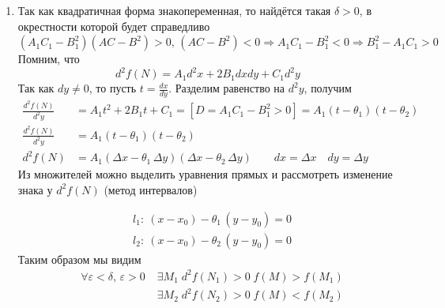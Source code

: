 \begin{Proof}
\begin{enumerate}
            \item Так как квадратичная форма знакопеременная, то найдётся такая $\delta > 0$, в окрестности которой будет справедливо\\
            $(A_1C_1 - B_1^2)(AC - B^2) > 0, \, (AC - B^2) < 0 \Rightarrow A_1C_1 - B_1^2 < 0 \Rightarrow B_1^2 - A_1C_1 > 0$\\
            Помним, что
            \[
                d^2f(N) = A_1 d^2x + 2 B_1 dx dy + C_1 d^2y
            \]
            Так как $dy \neq 0$, то пусть $t = \frac{dx}{dy}$. Разделим равенство на $d^2y$, получим
            \begin{align*}
                \frac{d^2f(N)}{d^2y} &= A_1 t^2 + 2 B_1 t + C_1 = [ D = A_1C_1 - B_1^2 > 0] = A_1(t - \theta_1)(t - \theta_2)\\
                \frac{d^2f(N)}{d^2y} &= A_1(t - \theta_1)(t - \theta_2)\\
                d^2f(N) &= A_1(\Delta x - \theta_1\,\Delta y)(\Delta x - \theta_2\,\Delta y) \qquad dx = \Delta x \quad dy = \Delta y
            \end{align*}
            Из множителей можно выделить уравнения прямых и рассмотреть изменение знака у $d^2f(N)$ (метод интервалов)
            \begin{figure}[h!]
                \noindent{}
            \end{figure}
            \begin{align*}
                &l_1:\: (x - x_0) - \theta_1\,(y - y_0) = 0\\
                &l_2:\: (x - x_0) - \theta_2\,(y - y_0) = 0
            \end{align*}
            Таким образом мы видим
            \begin{align*}
                &\forall \varepsilon < \delta, \, \varepsilon > 0 \; & \exists M_1 \; d^2f(N_1) > 0 \; f(M) > f(M_1)\\
                & & \exists M_2 \; d^2f(N_2) > 0 \; f(M) < f(M_2)
            \end{align*}
        \end{enumerate}
    \end{Proof}

